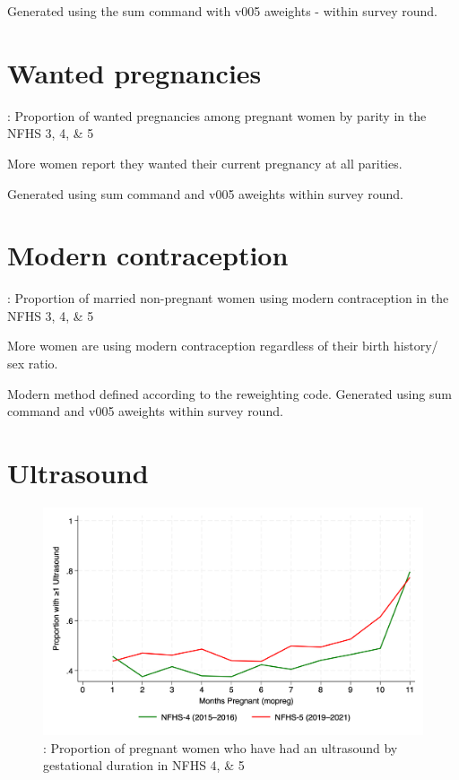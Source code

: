 \documentclass{article}
\begin{document}
Generated using the sum command with v005 aweights - within survey round.

\section{Wanted pregnancies}

\begin{table}[H]
    \centering
    \caption{: Proportion of wanted pregnancies among pregnant women by parity in the NFHS 3, 4, \& 5}
    \label{tab:sumstat}
\end{table}

More women report they wanted their current pregnancy at all parities. 

Generated using sum command and v005 aweights within survey round. 

\section{Modern contraception}

\begin{table}[H]
    \centering
    \caption{: Proportion of married non-pregnant women using modern contraception in the NFHS 3, 4, \& 5}
    \label{tab:sumstat}
\end{table}

More women are using modern contraception regardless of their birth history/ sex ratio.

Modern method defined according to the reweighting code. Generated using sum command and v005 aweights within survey round. 

\section{Ultrasound}

\begin{figure}[H]
    \centering
    \includegraphics[width=\textwidth]{figures/ultrasound by pregnancy duration.png}
    \caption{: Proportion of pregnant women who have had an ultrasound by gestational duration in NFHS 4, \& 5}
\end{figure}
\end{document}
